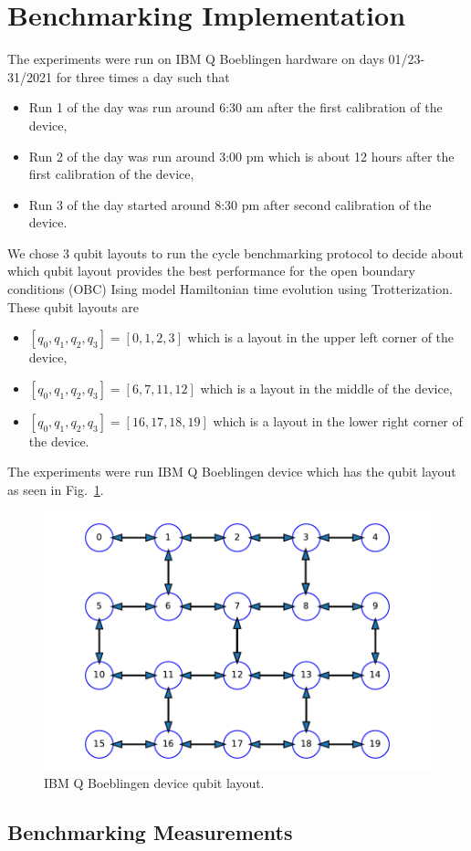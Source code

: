 \section{Benchmarking Implementation} 

The experiments were run on IBM Q Boeblingen hardware on days 01/23-31/2021 for three times a day such that 
\begin{itemize}
    \item Run 1 of the day was run around 6:30 am after the first calibration of the device, 
    \item Run 2 of the day was run around 3:00 pm which is about 12 hours after the first calibration of the device,  
    \item Run 3 of the day started around 8:30 pm after second calibration of the device.
\end{itemize} 
We chose 3 qubit layouts to run the cycle benchmarking protocol to decide about which qubit layout provides the best performance for the open boundary conditions (OBC) Ising model Hamiltonian time evolution using Trotterization. These qubit layouts are
\begin{itemize}
    \item $[q_0,q_1,q_2,q_3]=[0,1,2,3]$ which is a layout in the upper left corner of the device,
    \item $[q_0,q_1,q_2,q_3]=[6,7,11,12]$ which is a layout in the middle of the device,
    \item $[q_0,q_1,q_2,q_3]=[16,17,18,19]$ which is a layout in the lower right corner of the device.
\end{itemize}



The experiments were run IBM Q Boeblingen device which has the qubit layout as seen in Fig.~\ref{fig:BoeblingenLayout}. 
\begin{figure}[ht!]
    \includegraphics[scale=0.45]{QubitLayoutBoeblingen.pdf}
    \caption{IBM Q Boeblingen device qubit layout.}
    \label{fig:BoeblingenLayout}
\end{figure}


\subsection{Benchmarking Measurements}